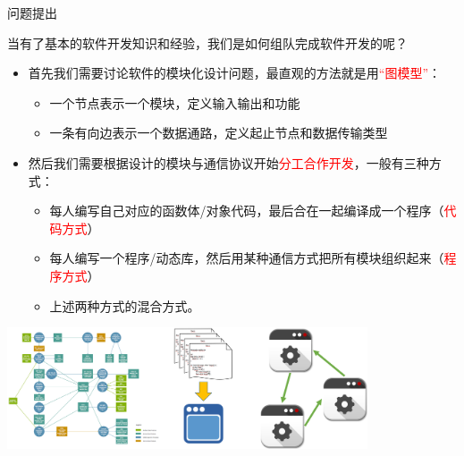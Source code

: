 \documentclass[9pt]{beamer}
\begin{document}
	\begin{frame}{问题提出}
		\begin{block}{当有了基本的软件开发知识和经验，我们是如何组队完成软件开发的呢？}
			\begin{itemize}
				\item<2-> 首先我们需要讨论软件的模块化设计问题，最直观的方法就是用\textcolor{red}{“图模型”}：
				\begin{itemize}
					\item 一个节点表示一个模块，定义输入输出和功能
					\item 一条有向边表示一个数据通路，定义起止节点和数据传输类型
				\end{itemize}
				\item<3-> 然后我们需要根据设计的模块与通信协议开始\textcolor{red}{分工合作开发}，一般有三种方式：
				\begin{itemize}
					\item 每人编写自己对应的函数体/对象代码，最后合在一起编译成一个程序（\textcolor{red}{代码方式}）
					\item 每人编写一个程序/动态库，然后用某种通信方式把所有模块组织起来（\textcolor{red}{程序方式}）
					\item 上述两种方式的混合方式。
				\end{itemize}
			\end{itemize}
		\end{block}
		\begin{center}
			\includegraphics[width=0.8\textwidth]{./img/graph}
		\end{center}
	\end{frame}
	
\end{document}
